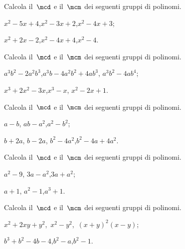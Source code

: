 \begin{esercizio}[\Ast]
\label{ese:13.89}
Calcola il~$\mcd$ e il~$\mcm$ dei seguenti gruppi di polinomi.
\begin{multicols}{2}
\begin{enumeratea}
 \item $x^{2}-5x+4$,\quad $x^{2}-3x+2$,\quad $x^{2}-4x+3$;
 \item $x^{2}+2x-2$,\quad $x^{2}-4x+4$,\quad $x^{2}-4$.
\end{enumeratea}
\end{multicols}
\end{esercizio}

\begin{esercizio}[\Ast]
\label{ese:13.90}
Calcola il~$\mcd$ e il~$\mcm$ dei seguenti gruppi di polinomi.
\begin{enumeratea}
 \item $a^{3}b^{2}-2a^{2}b^{3}$,\quad $a^{3}b-4a^{2}b^{2}+4ab^{3}$, $a^{3}b^{2}-4ab^{4}$;
 \item $x^{3}+2x^{2}-3x$,\quad $x^{3}-x$, $x^{2}-2x+1$.
\end{enumeratea}
\end{esercizio}

\begin{esercizio}[\Ast]
\label{ese:13.91}
Calcola il~$\mcd$ e il~$\mcm$ dei seguenti gruppi di polinomi.
\begin{multicols}{2}
\begin{enumeratea}
 \item $a-b$, $ab-a^{2}$,\quad $a^{2}-b^{2}$;
 \item $b+2a$, $b-2a$, $b^{2}-4a^{2}$,\quad $b^{2}-4a+4a^{2}$.
\end{enumeratea}
\end{multicols}
\end{esercizio}

\begin{esercizio}[\Ast]
\label{ese:13.92}
Calcola il~$\mcd$ e il~$\mcm$ dei seguenti gruppi di polinomi.
\begin{multicols}{2}
\begin{enumeratea}
 \item $a^{2}-9$, $3a-a^{2}$,\quad $3a+a^{2}$;
 \item $a+1$, $a^{2}-1$,\quad $a^{3}+1$.
\end{enumeratea}
\end{multicols}
\end{esercizio}

\begin{esercizio}[\Ast]
\label{ese:13.93}
Calcola il~$\mcd$ e il~$\mcm$ dei seguenti gruppi di polinomi.
\begin{multicols}{2}
\begin{enumeratea}
 \item $x^{2}+2xy+y^{2}$,\, $x^{2}-y^{2}$,\, $(x+y)^{2}(x-y)$;
 \item $b^{3}+b^{2}-4b-4$,\quad $b^{2}-a$,\quad $b^{2}-1$.
\end{enumeratea}
\end{multicols}
\end{esercizio}

